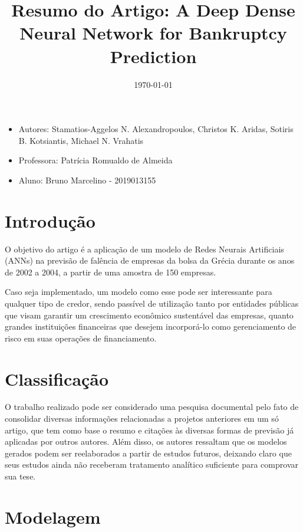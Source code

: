 \documentclass[12pt, a4paper]{article}
\title{Resumo do Artigo: A Deep Dense Neural Network for Bankruptcy Prediction}
\date{\today}
\begin{document}
\maketitle

\graphicspath{ {images/} }

\begin{itemize}
    \item Autores: Stamatios-Aggelos N. Alexandropoulos, Christos K. Aridas, Sotiris B. Kotsiantis, Michael N. Vrahatis
    \item Professora: Patrícia Romualdo de Almeida
    \item Aluno: Bruno Marcelino - 2019013155
\end{itemize}



\section{Introdução}

O objetivo do artigo é a aplicação de um modelo de Redes Neurais Artificiais (ANNs) na previsão de falência de empresas da bolsa da Grécia durante os anos de 2002 a 2004, a partir de uma amostra de 150 empresas.

Caso seja implementado, um modelo como esse pode ser interessante para qualquer tipo de credor, sendo passível de utilização tanto por entidades públicas que visam garantir um crescimento econômico sustentável das empresas, quanto grandes instituições financeiras que desejem incorporá-lo como gerenciamento de risco em suas operações de financiamento. 

\section{Classificação}

O trabalho realizado pode ser considerado uma pesquisa documental pelo fato de consolidar diversas informações relacionadas a projetos anteriores em um só artigo, que tem como base o resumo e citações às diversas formas de previsão já aplicadas por outros autores. Além disso, os autores ressaltam que os modelos gerados podem ser reelaborados a partir de estudos futuros, deixando claro que seus estudos ainda não receberam tratamento analítico suficiente para comprovar sua tese.

\section{Modelagem}
\end{document}
